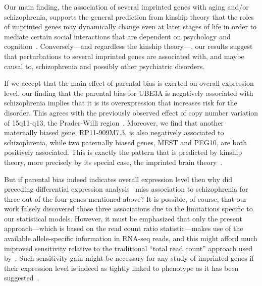 \documentclass[letterpaper]{article}
\begin{document}
Our main finding, the association of several imprinted genes with aging
and/or schizophrenia, supports the general prediction from kinship theory that the
roles of imprinted genes may dynamically change even at later stages of life
in order to mediate certain social interactions that are dependent on 
psychology and cognition~\cite{Ubeda2012,Wilkins2003}.  Conversely---and regardless
the kinship theory---, our results suggest that perturbations to several
imprinted genes are associated with, and maybe causal to, schizophrenia and
possibly other psychiatric disorders.

If we accept that the main effect of parental bias is exerted on overall expression
level, our finding that the parental bias for UBE3A is negatively associated
with schizophrenia implies that it is its overexpression that increases risk
for the disorder.  This agrees with the previously observed effect of copy
number variation of 15q11-q13, the Prader-Willi region~\cite{McNamara2013}.
Moreover, we find that another maternally biased gene, RP11-909M7.3, is also
negatively associated to schizophrenia, while two paternally biased genes,
MEST and PEG10, are both positively associated.  This is exactly the pattern
that is predicted by kinship theory, more precisely by its special case, the
imprinted brain theory~\cite{Crespi2008a}.

But if parental bias indeed indicates overall expression level then why did
preceding differential expression analysis~\cite{Fromer2016a} miss association
to schizophrenia for three out of the four genes mentioned above?  It is
possible, of course, that our work falsely discovered those three associations
due to the limitations specific to our statistical models.
However, it must be emphasized that only the present approach---which is based on the read
count ratio statistic---makes use of the available allele-specific information in RNA-seq
reads, and this might afford much improved sensitivity relative to the
traditional ``total read count'' approach used by~\cite{Fromer2016a}.  Such
sensitivity gain might be necessary for any study of imprinted genes if their
expression level is indeed as tightly linked to phenotype as it has been suggested~\cite{McNamara2013}.
\end{document}

